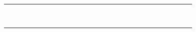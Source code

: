 \begin{table}
\begin{tabular}{p{4.5cm}*{26}{D}}
\anonstrut\textcolor{codelabel}{} & \X &  &  &  &  &  &  &  &  &  & \X &  &  &  &  &  &  &  &  &  & \X &  &  &  &  &  \\
\anonstrut\textcolor{codelabel}{} &  & \X &  &  &  &  &  &  &  &  &  & \X &  &  &  &  &  &  &  &  & \X &  &  &  &  &  \\
\anonstrut\textcolor{codelabel}{} & \X &  & \X &  &  &  &  &  &  &  &  & \X &  &  &  &  &  &  &  &  & \X &  &  &  &  &  \\
\anonstrut\textcolor{codelabel}{} & \X &  & \X &  & \X & \X &  &  &  &  & \X &  &  &  &  &  &  &  &  &  & \X &  &  &  &  &  \\
\anonstrut\textcolor{codelabel}{} & \X &  & \X &  & \X & \X & \X & \X &  &  & \X &  &  &  &  &  &  &  &  &  & \X &  & \X &  &  &  \\
\anonstrut\textcolor{codelabel}{} &  & \X &  &  &  &  &  &  &  &  &  & \X &  &  &  &  &  &  &  &  & \X &  &  &  &  &  \\
\anonstrut\textcolor{codelabel}{} &  & \X &  &  &  &  &  &  &  &  & \X &  &  &  &  &  &  &  &  &  & \X &  &  &  &  &  \\
\anonstrut\textcolor{codelabel}{} &  & \X &  &  &  &  &  &  &  &  & \X &  &  &  &  &  &  &  &  &  & \X &  &  &  &  &  \\
\anonstrut\textcolor{codelabel}{} & \X &  &  &  &  &  & \X &  &  &  &  & \X &  &  &  &  &  &  &  &  & \X & \X &  &  &  &  \\
\bottomrule
\end{tabular}
\end{table}
\tagmcend
 
 

